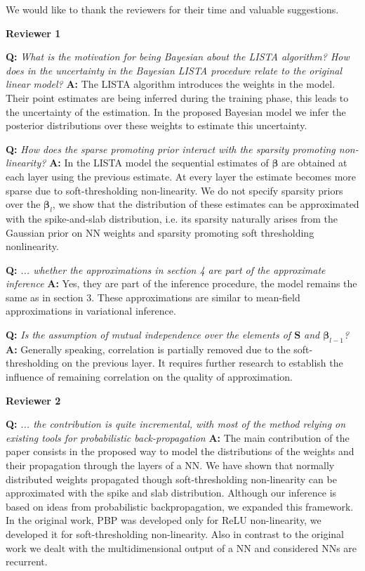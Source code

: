 \documentclass{article}
\begin{document}
We would like to thank the reviewers for their time and valuable suggestions.

\textbf{Reviewer 1}

\textbf{Q:} \textit{What is the motivation for being Bayesian about the LISTA algorithm? How does in the uncertainty in the Bayesian LISTA procedure relate to the original linear model?}
\textbf{A:} The LISTA algorithm introduces the weights in the model. Their point estimates are being inferred during the training phase, this leads to the uncertainty of the estimation. In the proposed Bayesian model we infer the posterior distributions over these weights to estimate this uncertainty.

\textbf{Q:} \textit{How does the sparse promoting prior interact with the sparsity promoting non-linearity?}
\textbf{A:} In the LISTA model the sequential estimates of $\boldsymbol{\beta}$ are obtained at each layer using the previous estimate. At every layer the estimate becomes more sparse due to soft-thresholding non-linearity. We do not specify sparsity priors over the $\boldsymbol{\beta}_l$, we show that the distribution of these estimates can be approximated with the spike-and-slab distribution, i.e. its sparsity naturally arises from the Gaussian prior on NN weights and sparsity promoting soft thresholding nonlinearity.

\textbf{Q:} \textit{... whether the approximations in section 4 are part of the approximate inference} 
\textbf{A:} Yes, they are part of the inference procedure, the model remains the same as in section 3. These approximations are similar to mean-field approximations in variational inference.

\textbf{Q:} \textit{Is the assumption of mutual independence over the elements of $\mathbf{S}$ and $\boldsymbol{\beta}_{l-1}$?}
\textbf{A:} Generally speaking, correlation is partially removed due to the soft-thresholding on the previous layer. It requires further research to establish the influence of remaining correlation on the quality of approximation.

\textbf{Reviewer 2}

\textbf{Q:} \textit{... the contribution is quite incremental, with most of the method relying on existing tools for probabilistic back-propagation}
\textbf{A:} The main contribution of the paper consists in the proposed way to model the distributions of the weights and their propagation through the layers of a NN. We have shown that normally distributed weights propagated though soft-thresholding non-linearity can be approximated with the spike and slab distribution. Although our inference is based on ideas from probabilistic backpropagation, we expanded this framework. In the original work, PBP was developed only for ReLU non-linearity, we developed it for soft-thresholding non-linearity. Also in contrast to the original work we dealt with the multidimensional output of a NN and considered NNs are recurrent. 
\end{document}
